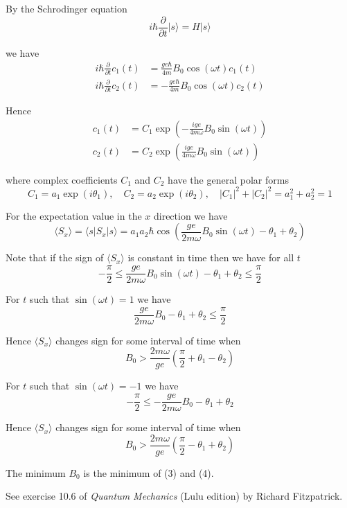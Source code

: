 By the Schrodinger equation
\begin{equation*}
i\hbar\frac{\partial}{\partial t}|s\rangle=H|s\rangle
\end{equation*}

we have
\begin{align*}
i\hbar\frac{\partial}{\partial t}c_1(t)&=\frac{ge\hbar}{4m}B_0\cos(\omega t)c_1(t)
\\
i\hbar\frac{\partial}{\partial t}c_2(t)&=-\frac{ge\hbar}{4m}B_0\cos(\omega t)c_2(t)
\end{align*}

Hence
\begin{equation*}
\begin{aligned}
c_1(t)&=C_1\exp\left(-\frac{ige}{4m\omega}B_0\sin(\omega t)\right)
\\
c_2(t)&=C_2\exp\left(\frac{ige}{4m\omega}B_0\sin(\omega t)\right)
\end{aligned}
\tag{1}
\end{equation*}

where complex coefficients $C_1$ and $C_2$ have the general polar forms
\begin{equation*}
C_1=a_1\exp(i\theta_1),\quad C_2=a_2\exp(i\theta_2),\quad|C_1|^2+|C_2|^2=a_1^2+a_2^2=1
\end{equation*}

For the expectation value in the $x$ direction we have
\begin{equation*}
\langle S_x\rangle=\langle s|S_x|s\rangle
=a_1a_2\hbar\cos\left(\frac{ge}{2m\omega}B_0\sin(\omega t)-\theta_1+\theta_2\right)
\tag{2}
\end{equation*}

Note that if the sign of $\langle S_x\rangle$ is constant in time then we have for all $t$
\begin{equation*}
-\frac{\pi}{2}\le\frac{ge}{2m\omega}B_0\sin(\omega t)-\theta_1+\theta_2\le\frac{\pi}{2}
\end{equation*}

For $t$ such that $\sin(\omega t)=1$ we have
\begin{equation*}
\frac{ge}{2m\omega}B_0-\theta_1+\theta_2\le\frac{\pi}{2}
\end{equation*}

Hence $\langle S_x\rangle$ changes sign for some interval of time when
\begin{equation*}
B_0>\frac{2m\omega}{ge}\left(\frac{\pi}{2}+\theta_1-\theta_2\right)
\tag{3}
\end{equation*}

For $t$ such that $\sin(\omega t)=-1$ we have
\begin{equation*}
-\frac{\pi}{2}\le-\frac{ge}{2m\omega}B_0-\theta_1+\theta_2
\end{equation*}

Hence $\langle S_x\rangle$ changes sign for some interval of time when
\begin{equation*}
B_0>\frac{2m\omega}{ge}\left(\frac{\pi}{2}-\theta_1+\theta_2\right)
\tag{4}
\end{equation*}

The minimum $B_0$ is the minimum of (3) and (4).

\bigskip
See exercise 10.6 of {\it Quantum Mechanics}
(Lulu edition) by Richard Fitzpatrick.


